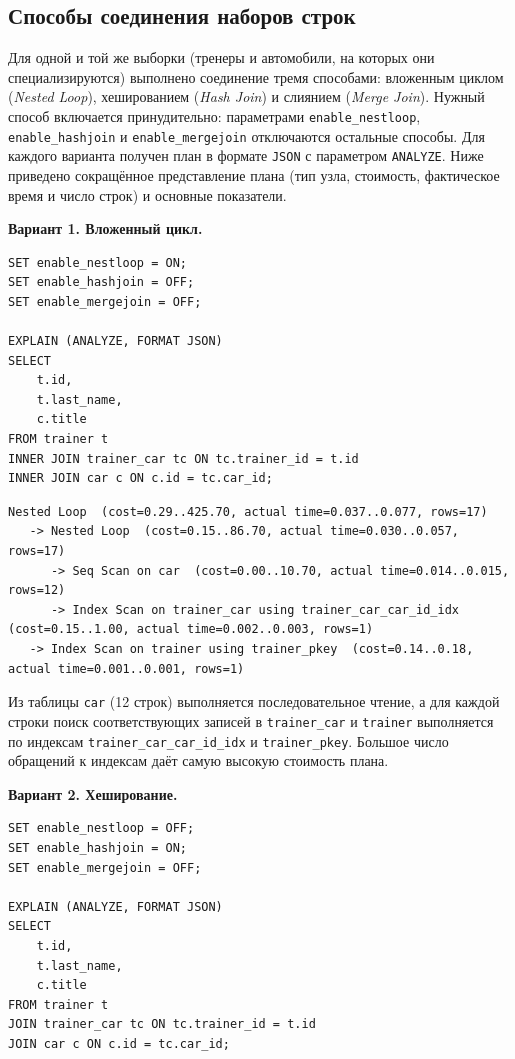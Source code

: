 \documentclass[oneside,a4paper,14pt]{extarticle}
\begin{document}
\subsection{Способы соединения наборов строк}

Для одной и той же выборки (тренеры и автомобили, на которых они специализируются) выполнено соединение тремя способами: вложенным циклом (\textit{Nested Loop}), хешированием (\textit{Hash Join}) и слиянием (\textit{Merge Join}). Нужный способ включается принудительно: параметрами \texttt{enable\_\allowbreak nestloop}, \texttt{enable\_\allowbreak hashjoin} и \texttt{enable\_\allowbreak mergejoin} отключаются остальные способы. Для каждого варианта получен план в формате \texttt{JSON} с параметром \texttt{ANALYZE}. Ниже приведено сокращённое представление плана (тип узла, стоимость, фактическое время и число строк) и основные показатели.

\textbf{Вариант 1. Вложенный цикл.}

\begin{verbatim}
SET enable_nestloop = ON;
SET enable_hashjoin = OFF;
SET enable_mergejoin = OFF;

EXPLAIN (ANALYZE, FORMAT JSON)
SELECT
    t.id,
    t.last_name,
    c.title
FROM trainer t
INNER JOIN trainer_car tc ON tc.trainer_id = t.id
INNER JOIN car c ON c.id = tc.car_id;
\end{verbatim}

\begin{Verbatim}[fontsize=\footnotesize,breaklines=true,breakanywhere=true]
Nested Loop  (cost=0.29..425.70, actual time=0.037..0.077, rows=17)
   -> Nested Loop  (cost=0.15..86.70, actual time=0.030..0.057, rows=17)
      -> Seq Scan on car  (cost=0.00..10.70, actual time=0.014..0.015, rows=12)
      -> Index Scan on trainer_car using trainer_car_car_id_idx  (cost=0.15..1.00, actual time=0.002..0.003, rows=1)
   -> Index Scan on trainer using trainer_pkey  (cost=0.14..0.18, actual time=0.001..0.001, rows=1)
\end{Verbatim}


Из таблицы \texttt{car} (12 строк) выполняется последовательное чтение, а для каждой строки поиск соответствующих записей в \texttt{trainer\_car} и \texttt{trainer} выполняется по индексам \texttt{trainer\_car\_car\_id\_idx} и \texttt{trainer\_pkey}. Большое число обращений к индексам даёт самую высокую стоимость плана.


\textbf{Вариант 2. Хеширование.}

\begin{verbatim}
SET enable_nestloop = OFF;
SET enable_hashjoin = ON;
SET enable_mergejoin = OFF;

EXPLAIN (ANALYZE, FORMAT JSON)
SELECT
    t.id,
    t.last_name,
    c.title
FROM trainer t
JOIN trainer_car tc ON tc.trainer_id = t.id
JOIN car c ON c.id = tc.car_id;
\end{verbatim}
\end{document}
